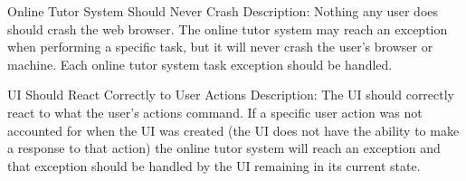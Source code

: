     \begin{section}{Online Tutor System Should Never Crash}
        Description: Nothing any user does should crash the web browser.  The online tutor system may 
        reach an exception when performing a specific task, but it will never crash the user's browser 
        or machine.  Each online tutor system task exception should be handled.
    \end{section}
    
    \begin{section}{UI Should React Correctly to User Actions}
        Description: The UI should correctly react to what the user's actions command.  
        If a specific user action was not accounted for when the UI was created (the UI does not have the 
        ability to make a response to that action) the online tutor system will reach an exception and that 
        exception should be handled by the UI remaining in its current state.
    \end{section}
    
